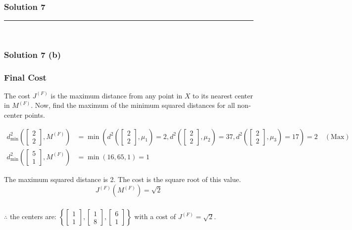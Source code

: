 \documentclass{article}
\begin{document}
\newpage
\subsubsection*{Solution 7}
\noindent\rule{\textwidth}{0.4pt}\\
\subsubsection*{Solution 7 (b)}
\subsubsection*{Final Cost}
\begin{flushleft}
The cost $J^{(F)}$ is the maximum distance from any point in $X$ to its nearest center in $M^{(F)}$. Now, find the maximum of the minimum squared distances for all non-center points.
\end{flushleft}
\begin{align*}
    d^2_{\min}\left(\begin{bmatrix}2 \\ 2\end{bmatrix}, M^{(F)}\right) &= \min\left(d^2(\begin{bmatrix}2 \\ 2\end{bmatrix}, \mu_1)=2, d^2(\begin{bmatrix}2 \\ 2\end{bmatrix}, \mu_2)=37, d^2(\begin{bmatrix}2 \\ 2\end{bmatrix}, \mu_3)=17\right) = 2 \quad (\text{Max}) \\
    d^2_{\min}\left(\begin{bmatrix}5 \\ 1\end{bmatrix}, M^{(F)}\right) &= \min(16, 65, 1) = 1
\end{align*}
\begin{flushleft}
The maximum squared distance is 2. The cost is the square root of this value.
$$ J^{(F)}(M^{(F)}) = \sqrt{2} $$
\end{flushleft}

\subsubsection*{\normalfont}{$\therefore$ the centers are: $\left\{ \begin{bmatrix}1 \\ 1\end{bmatrix}, \begin{bmatrix}1 \\ 8\end{bmatrix}, \begin{bmatrix}6 \\ 1\end{bmatrix} \right\}$ with a cost of $J^{(F)}=\sqrt{2}$.}
\end{document}

